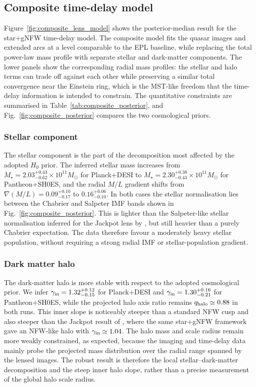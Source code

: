 \documentclass[fleqn,usenatbib]{mnras}
\begin{document}
\subsection{Composite time-delay model}
\label{sec:composite_results}

Figure~\ref{fig:composite_lens_model} shows the posterior-median result for the star+gNFW time-delay model. The composite model fits the quasar images and extended arcs at a level comparable to the EPL baseline, while replacing the total power-law mass profile with separate stellar and dark-matter components. The lower panels show the corresponding radial mass profiles: the stellar and halo terms can trade off against each other while preserving a similar total convergence near the Einstein ring, which is the MST-like freedom that the time-delay information is intended to constrain. The quantitative constraints are summarised in Table~\ref{tab:composite_posterior}, and Fig.~\ref{fig:composite_posterior} compares the two cosmological priors.

\subsubsection{Stellar component}

The stellar component is the part of the decomposition most affected by the adopted \(H_0\) prior. The inferred stellar mass increases from \(M_\star=2.03^{+0.43}_{-0.62}\times10^{11}M_\odot\) for Planck+DESI to \(M_\star=2.30^{+0.38}_{-0.43}\times10^{11}M_\odot\) for Pantheon+SH0ES, and the radial \(M/L\) gradient shifts from \(\nabla(M/L)=0.09^{+0.10}_{-0.17}\) to \(0.16^{+0.06}_{-0.10}\). In both cases the stellar normalisation lies between the Chabrier and Salpeter IMF bands shown in Fig.~\ref{fig:composite_posterior}. This is lighter than the Salpeter-like stellar normalisation inferred for the Jackpot lens by \citet{Tian2026}, but still heavier than a purely Chabrier expectation. The data therefore favour a moderately heavy stellar population, without requiring a strong radial IMF or stellar-population gradient.

\subsubsection{Dark matter halo}

The dark-matter halo is more stable with respect to the adopted cosmological prior. We infer \(\gamma_{\rm in}=1.32^{+0.12}_{-0.15}\) for Planck+DESI and \(\gamma_{\rm in}=1.30^{+0.16}_{-0.21}\) for Pantheon+SH0ES, while the projected halo axis ratio remains \(q_{\rm halo}\simeq0.88\) in both runs. This inner slope is noticeably steeper than a standard NFW cusp and also steeper than the Jackpot result of \citet{Tian2026}, where the same star+gNFW framework gave an NFW-like halo with \(\gamma_{\rm in}\simeq1.04\). The halo mass and scale radius remain more weakly constrained, as expected, because the imaging and time-delay data mainly probe the projected mass distribution over the radial range spanned by the lensed images. The robust result is therefore the local stellar--dark-matter decomposition and the steep inner halo slope, rather than a precise measurement of the global halo scale radius.
\end{document}
